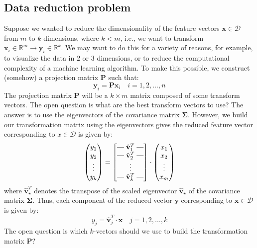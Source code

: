 \documentclass{article}[11pt]
\makeatletter
\newcommand{\brows}[1]{%
  \begin{bmatrix}
  \begin{array}{@{\protect\rotvert\;}c@{\;\protect\rotvert}}
  #1
  \end{array}
  \end{bmatrix}
}
\newcommand{\rotvert}{\rotatebox[origin=c]{90}{$\vert$}}
\newcommand{\rowsvdots}{\multicolumn{1}{@{}c@{}}{\vdots}}
\def\R{\mathbb{R}}
\def\D{\mathcal{D}}
\makeatother
\begin{document}
\subsection{Data reduction problem}
Suppose we wanted to reduce the dimensionality of the feature vectors $\mathbf{x}\in\D$ from $m$ to $k$ dimensions, where $k<m$, 
i.e., we want to transform $\mathbf{x}_{i}\in\R^{m}\rightarrow\mathbf{y}_{i}\in\R^{k}$. 
We may want to do this for a variety of reasons, for example, to visualize the data in $2$ or $3$ dimensions, or to reduce the computational complexity of a machine learning algorithm.
To make this possible, we construct (somehow) a projection matrix $\mathbf{P}$ such that:
\begin{equation}
   \mathbf{y}_{i} = \mathbf{P}\mathbf{x}_{i}\quad{i=1,2,\dots,n}
\end{equation}
The projection matrix $\mathbf{P}$ will be a $k\times{m}$ matrix composed of some transform vectors. The open question is 
what are the best transform vectors to use? The answer is to use the eigenvectors of the covariance matrix $\mathbf{\Sigma}$.
However, we build our transformation matrix using the eigenvectors gives the reduced feature vector corresponding to $x\in\D$ is given by:
\begin{equation}
   \begin{pmatrix}
      y_{1} \\
      y_{2} \\
      \vdots \\
      y_{k}
   \end{pmatrix} = \brows{\hat{\mathbf{v}}_1^T \\ \hat{\mathbf{v}}_2^T \\ \rowsvdots \\ \hat{\mathbf{v}}_k^T}
   \cdot
   \begin{pmatrix}
      x_{1} \\
      x_{2} \\
      \vdots \\
      x_{m}
   \end{pmatrix}
\end{equation}
where $\hat{\mathbf{v}}_{\star}^{T}$ denotes the transpose of the scaled eigenvector $\hat{\mathbf{v}}_{\star}$ of the covariance matrix $\mathbf{\Sigma}$.
Thus, each component of the reduced vector $\mathbf{y}$ corresponding to $\mathbf{x}\in\D$ is given by:
\begin{equation}
   y_{j} = \hat{\mathbf{v}}_{j}^{T}\cdot\mathbf{x}\quad{j=1,2,\dots,k}
\end{equation}
The open question is which $k$-vectors should we use to build the transformation matrix $\mathbf{P}$? 
\end{document}
